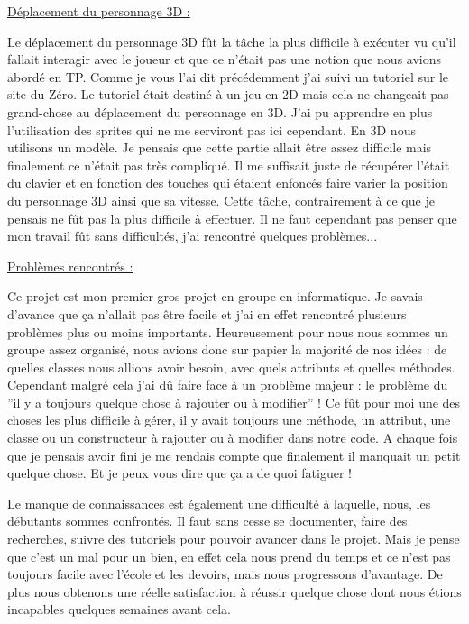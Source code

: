 \documentclass{article}
\begin{document}
\underline{Déplacement du personnage 3D :}
\newline
\par
Le déplacement du personnage 3D fût la tâche la plus difficile à exécuter vu qu'il fallait interagir avec le joueur et que ce n'était pas une notion que nous avions abordé en TP. Comme je vous l'ai dit précédemment j'ai suivi un tutoriel sur le site du Zéro. Le tutoriel était destiné à un jeu en 2D mais cela ne changeait pas grand-chose au déplacement du personnage en 3D. J'ai pu apprendre en plus l'utilisation des sprites qui ne me serviront pas ici cependant. En 3D nous utilisons un modèle. Je pensais que cette partie allait être assez difficile mais finalement ce n'était pas très compliqué. Il me suffisait juste de récupérer l'était du clavier et en fonction des touches qui étaient enfoncés faire varier la position du personnage 3D ainsi que sa vitesse.  Cette tâche, contrairement à ce que je pensais ne fût pas la plus difficile à effectuer.
 Il ne faut cependant pas penser que mon travail fût sans difficultés, j'ai rencontré quelques problèmes...    
\newline

\par
\underline{Problèmes rencontrés :}
\newline
\par
Ce projet est mon premier gros projet en groupe en informatique. Je savais d'avance que ça n'allait pas être facile et j'ai en effet rencontré plusieurs problèmes plus ou moins importants. Heureusement pour nous nous sommes un groupe assez organisé, nous avions donc sur papier la majorité de nos idées : de quelles classes nous allions avoir besoin, avec quels attributs et quelles méthodes. Cependant malgré cela j'ai dû faire face à un problème majeur : le problème du ''il y a toujours quelque chose à rajouter ou à modifier'' ! Ce fût pour moi une des choses les plus difficile à gérer, il y avait toujours une méthode, un attribut, une classe ou un constructeur à rajouter ou à modifier dans notre code. A chaque fois que je pensais avoir fini je me rendais compte que finalement il manquait un petit quelque chose. Et je peux vous dire que ça a de quoi fatiguer !
\newline

\par
Le manque de connaissances est également une difficulté à laquelle, nous, les débutants sommes confrontés. Il faut sans cesse se documenter, faire des recherches, suivre des tutoriels pour pouvoir avancer dans le projet. Mais je pense que c'est un mal pour un bien, en effet cela nous prend du temps et ce n'est pas toujours facile avec l'école et les devoirs, mais nous progressons d'avantage. De plus nous obtenons une réelle satisfaction à réussir quelque chose dont nous étions incapables  quelques semaines avant cela.
\newline
\end{document}
